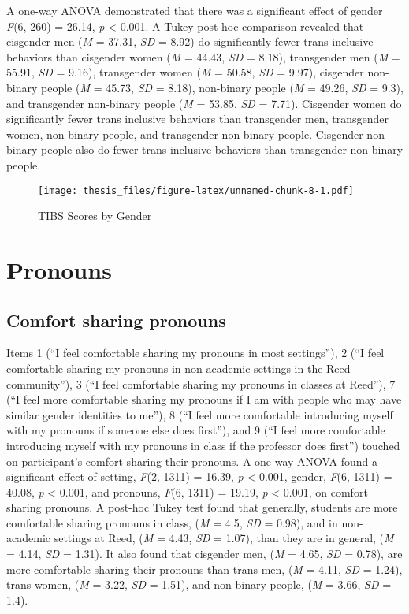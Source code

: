 \documentclass[12pt,twoside]{reedthesis}
\begin{document}
A one-way ANOVA demonstrated that there was a significant effect of gender \emph{F}(6, 260) = 26.14, \emph{p} \textless{} 0.001.
A Tukey post-hoc comparison revealed that cisgender men (\emph{M} = 37.31, \emph{SD} = 8.92) do significantly fewer trans inclusive behaviors than cisgender women (\emph{M} = 44.43, \emph{SD} = 8.18), transgender men (\emph{M} = 55.91, \emph{SD} = 9.16), transgender women (\emph{M} = 50.58, \emph{SD} = 9.97), cisgender non-binary people (\emph{M} = 45.73, \emph{SD} = 8.18), non-binary people (\emph{M} = 49.26, \emph{SD} = 9.3), and transgender non-binary people (\emph{M} = 53.85, \emph{SD} = 7.71). Cisgender women do significantly fewer trans inclusive behaviors than transgender men, transgender women, non-binary people, and transgender non-binary people. Cisgender non-binary people also do fewer trans inclusive behaviors than transgender non-binary people.
\begin{figure}
\centering
\texttt{[image: thesis\_files/figure-latex/unnamed-chunk-8-1.pdf]}
\caption{\label{fig:unnamed-chunk-8}TIBS Scores by Gender}
\end{figure}
\hypertarget{pronouns-1}{%
\section{Pronouns}\label{pronouns-1}}

\hypertarget{comfort-sharing-pronouns}{%
\subsection{Comfort sharing pronouns}\label{comfort-sharing-pronouns}}

Items 1 (``I feel comfortable sharing my pronouns in most settings''), 2 (``I feel comfortable sharing my pronouns in non-academic settings in the Reed community''), 3 (``I feel comfortable sharing my pronouns in classes at Reed''), 7 (``I feel more comfortable sharing my pronouns if I am with people who may have similar gender identities to me''), 8 (``I feel more comfortable introducing myself with my pronouns if someone else does first''), and 9 (``I feel more comfortable introducing myself with my pronouns in class if the professor does first'') touched on participant's comfort sharing their pronouns.
A one-way ANOVA found a significant effect of setting, \emph{F}(2, 1311) = 16.39, \emph{p} \textless{} 0.001, gender, \emph{F}(6, 1311) = 40.08, \emph{p} \textless{} 0.001, and pronouns, \emph{F}(6, 1311) = 19.19, \emph{p} \textless{} 0.001, on comfort sharing pronouns. A post-hoc Tukey test found that generally, students are more comfortable sharing pronouns in class, (\emph{M} = 4.5, \emph{SD} = 0.98), and in non-academic settings at Reed, (\emph{M} = 4.43, \emph{SD} = 1.07), than they are in general, (\emph{M} = 4.14, \emph{SD} = 1.31). It also found that cisgender men, (\emph{M} = 4.65, \emph{SD} = 0.78), are more comfortable sharing their pronouns than trans men, (\emph{M} = 4.11, \emph{SD} = 1.24), trans women, (\emph{M} = 3.22, \emph{SD} = 1.51), and non-binary people, (\emph{M} = 3.66, \emph{SD} = 1.4).
\end{document}

